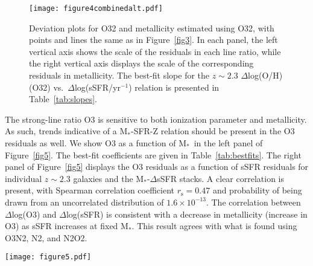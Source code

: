 \documentclass[iop,twocolappendix]{emulateapj}
\newcommand{\mstar}{$\mbox{M}_*$}
\begin{document}
\begin{figure}
 \texttt{[image: figure4combinedalt.pdf]}
 \centering
 \caption{Deviation plots for O32 and metallicity estimated using O32, with points and lines the same as
 in Figure~\ref{fig3}.
  In each panel, the left vertical axis shows the scale of the residuals in each line ratio,
 while the right vertical axis displays the scale of the corresponding residuals in metallicity.
  The best-fit slope for the $z\sim2.3$ $\Delta$log(O/H) (O32) vs.~$\Delta$log(sSFR/yr$^{-1}$)
 relation is presented in Table~\ref{tab:slopes}.
}\label{fig4}
\end{figure}

The strong-line ratio O3 is sensitive to both ionization parameter and metallicity.
  As such, trends indicative of
 a \mstar-SFR-Z relation should be present in the O3 residuals as well. %
  We show O3 as a function of \mstar\ in the left panel of Figure~\ref{fig5}.  The best-fit coefficients
 are given in Table~\ref{tab:bestfits}.  The right panel of Figure~\ref{fig5} displays the O3 residuals
 as a function of sSFR residuals for individual $z\sim2.3$ galaxies and the \mstar-$\Delta$sSFR stacks.
  A clear correlation is present, with Spearman correlation coefficient $r_{\text{s}}=0.47$ and probability of
 being drawn from an uncorrelated distribution of $1.6\times10^{-13}$.
  The correlation between $\Delta$log(O3) and $\Delta$log(sSFR) is consistent with a decrease in metallicity
 (increase in O3) as sSFR increases at fixed \mstar.  This result agrees with what is found
 using O3N2, N2, and N2O2.

\begin{figure*}
 \texttt{[image: figure5.pdf]}
 \centering
 \caption{\textsc{Left:} The line ratio O3 as a function of \mstar\ for the $z\sim2.3$ and $z\sim0$ samples,
 with points and lines the same as in Figure~\ref{fig2}.
  \textsc{Right:} The deviation plot of $\Delta$log(O3) vs.~$\Delta$log(sSFR/yr$^{-1}$) for $z\sim2.3$
 galaxies, with points the same as in the middle column of Figure~\ref{fig3}.
}\label{fig5}
\end{figure*}
\end{document}
